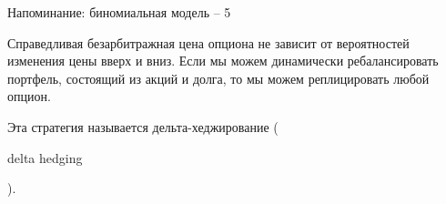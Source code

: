 \documentclass{beamer}
\newcommand{\en}[1]{\begin{otherlanguage}{english}#1\end{otherlanguage}}
\begin{document}
\begin{frame}{Напоминание: биномиальная модель -- 5}
\centering
{}

\justify
Справедливая безарбитражная цена опциона не зависит от вероятностей изменения цены вверх и вниз. Если мы можем \alert{динамически} ребалансировать портфель, состоящий из акций и долга, то мы можем реплицировать любой опцион.

\justify
Эта стратегия называется \alert{дельта-хеджирование} (\en{delta hedging}).
\end{frame}



\newcommand{\highlightStockLink}[6]{
	\draw[
		color=#4,
		very thick,
		->,
		>=triangle 45
	]
	(#1.east) -- (#2.west)
	node[
		pos=#5,
		anchor=#6
	]
	{#3};
}
\end{document}
